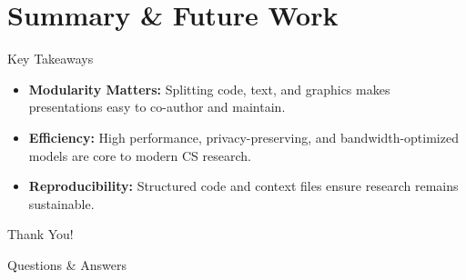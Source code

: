 
\section{Summary \& Future Work}

\begin{frame}{Key Takeaways}
    \begin{itemize}
        \item \textbf{Modularity Matters:} Splitting code, text, and graphics makes presentations easy to co-author and maintain.
        \item \textbf{Efficiency:} High performance, privacy-preserving, and bandwidth-optimized models are core to modern CS research.
        \item \textbf{Reproducibility:} Structured code and context files ensure research remains sustainable.
    \end{itemize}
\end{frame}

\begin{frame}[standout]
    Thank You!
    \vspace{0.5cm}

    \begin{center}
        \large Questions \& Answers
    \end{center}
\end{frame}
